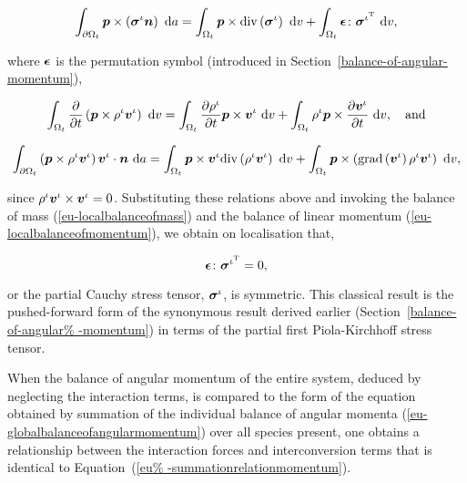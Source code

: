 \begin{displaymath}
\int_{\partial \Omega_{t}} \mbox{\boldmath$ p$} \times
\left(\mbox{\boldmath$\sigma$}^{\iota}\mbox{\boldmath$ n$}\right)\ \mathrm{d}a = \int_{\Omega_{t}}
\mbox{\boldmath$ p$} \times \mathrm{div}\left(\mbox{\boldmath$\sigma$}^{\iota}\right)\ \mathrm{d}v
+\int_{\Omega_{t}} \mbox{\boldmath$\epsilon$}\colon\mbox{\boldmath$\sigma$}^{\iota^{\mathrm{T}}}
\ \mathrm{d}v,
\end{displaymath}

\noindent where $\mbox{\boldmath$\epsilon$}$ is the permutation symbol (introduced in
Section~\ref{balance-of-angular-momentum}),

\begin{displaymath}
\int_{\Omega_{t}} \frac{\partial}{\partial t}\left( \mbox{\boldmath$ p$} \times
\rho^{\iota} \mbox{\boldmath$ v$}^{\iota}\right)\ \mathrm{d}v = \int_{\Omega_{t}}
\frac{\partial \rho^{\iota}} {\partial t} \mbox{\boldmath$ p$} \times
\mbox{\boldmath$ v$}^{\iota}\ \mathrm{d}v + \int_{\Omega_{t}} \rho^{\iota} \mbox{\boldmath$ p$} \times
\frac{\partial \mbox{\boldmath$ v$}^{\iota}} {\partial
  t}\ \mathrm{d}v,\quad\mathrm{and}
\end{displaymath}

\begin{displaymath}
\int_{\partial \Omega_{t}} \left(\mbox{\boldmath$ p$} \times \rho^{\iota}
\mbox{\boldmath$ v$}^{\iota}\right) \mbox{\boldmath$ v$}^{\iota} \cdot \mbox{\boldmath$ n$}\ \mathrm{d}a =
\int_{\Omega_{t}}\mbox{\boldmath$ p$} \times \mbox{\boldmath$ v$}^{\iota} \mathrm{div}
\left(\rho^{\iota}\mbox{\boldmath$ v$}^{\iota}\right)\ \mathrm{d}v +
\int_{\Omega_{t}}\mbox{\boldmath$ p$} \times
\left(\mathrm{grad}\left(\mbox{\boldmath$ v$}^{\iota}\right)
\rho^{\iota}\mbox{\boldmath$ v$}^{\iota}\right)\ \mathrm{d}v,
\end{displaymath}

\noindent since $\rho^{\iota} \mbox{\boldmath$ v$}^{\iota}\times\mbox{\boldmath$ v$}^{\iota} =
0$. Substituting these relations above and invoking the balance of
mass (\ref{eu-localbalanceofmass}) and the balance of linear momentum
(\ref{eu-localbalanceofmomentum}), we obtain on localisation that,

\begin{equation}
\mbox{\boldmath$\epsilon$}\colon\mbox{\boldmath$\sigma$}^{\iota^{\mathrm{T}}} = 0,
\label{eu-localbalanceofangularmomentum}
\end{equation}

\noindent or the partial Cauchy stress tensor, $\mbox{\boldmath$\sigma$}^{\iota}$, is
symmetric. This classical result is the pushed-forward form of the
synonymous result derived earlier (Section~\ref{balance-of-angular%
  -momentum}) in terms of the partial first Piola-Kirchhoff stress
tensor.

When the balance of angular momentum of the entire system, deduced by
neglecting the interaction terms, is compared to the form of the
equation obtained by summation of the individual balance of angular
momenta (\ref{eu-globalbalanceofangularmomentum}) over all species
present, one obtains a relationship between the interaction forces and
interconversion terms that is identical to Equation~(\ref{eu%
  -summationrelationmomentum}).

